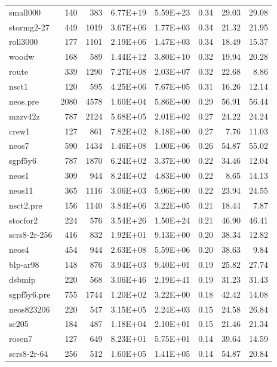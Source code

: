 \documentclass[10pt]{article}
\begin{document}
\begin{longtable}{|l|r|r|r|r|r|r|r|}
small000	&	140	&	383	&	6.77E+19	&	5.59E+23	&	0.34	&	29.03	&	29.08	\\
stormg2-27	&	449	&	1019	&	3.67E+06	&	1.77E+03	&	0.34	&	21.32	&	21.95	\\
roll3000	&	177	&	1101	&	2.19E+06	&	1.47E+03	&	0.34	&	18.49	&	15.37	\\
woodw	&	168	&	589	&	1.44E+12	&	3.80E+10	&	0.32	&	19.94	&	20.28	\\
route	&	339	&	1290	&	7.27E+08	&	2.03E+07	&	0.32	&	22.68	&	8.86	\\
nsct1	&	120	&	595	&	4.25E+06	&	7.67E+05	&	0.31	&	16.26	&	12.14	\\
neos.pre	&	2080	&	4578	&	1.60E+04	&	5.86E+00	&	0.29	&	56.91	&	56.44	\\
mzzv42z	&	787	&	2124	&	5.68E+05	&	2.01E+02	&	0.27	&	24.22	&	24.24	\\
crew1	&	127	&	861	&	7.82E+02	&	8.18E+00	&	0.27	&	7.76	&	11.03	\\
neos7	&	590	&	1434	&	1.46E+08	&	1.00E+06	&	0.26	&	54.87	&	55.02	\\
sgpf5y6	&	787	&	1870	&	6.24E+02	&	3.37E+00	&	0.22	&	34.46	&	12.04	\\
neos1	&	309	&	944	&	8.24E+02	&	4.83E+00	&	0.22	&	8.65	&	14.13	\\
neos11	&	365	&	1116	&	3.06E+03	&	5.06E+00	&	0.22	&	23.94	&	24.55	\\
nsct2.pre	&	156	&	1140	&	3.84E+06	&	3.22E+05	&	0.21	&	18.44	&	7.87	\\
stocfor2	&	224	&	576	&	3.54E+26	&	1.50E+24	&	0.21	&	46.90	&	46.41	\\
scrs8-2r-256	&	416	&	832	&	1.92E+01	&	9.13E+00	&	0.20	&	38.34	&	12.82	\\
neos4	&	454	&	944	&	2.63E+08	&	5.59E+06	&	0.20	&	38.63	&	9.84	\\
blp-ar98	&	148	&	876	&	3.94E+03	&	9.40E+01	&	0.19	&	25.82	&	27.74	\\
dsbmip	&	220	&	568	&	3.06E+46	&	2.19E+41	&	0.19	&	31.23	&	31.43	\\
sgpf5y6.pre	&	755	&	1744	&	1.20E+02	&	3.22E+00	&	0.18	&	42.42	&	14.08	\\
neos823206	&	220	&	547	&	3.15E+05	&	2.24E+03	&	0.15	&	24.58	&	26.84	\\
sc205	&	184	&	487	&	1.18E+04	&	2.10E+01	&	0.15	&	21.46	&	21.34	\\
rosen7	&	127	&	649	&	8.23E+01	&	5.75E+01	&	0.14	&	39.64	&	14.59	\\
scrs8-2r-64	&	256	&	512	&	1.60E+05	&	1.41E+05	&	0.14	&	54.87	&	20.84	\\

\end{longtable}
\end{document}
